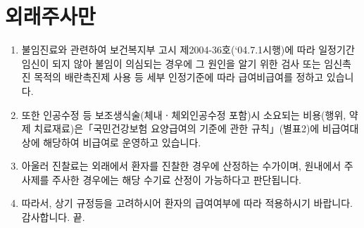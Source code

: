 \section{외래주사만}
%
{\begin{enumerate}\tightlist
\item 불임진료와 관련하여 보건복지부 고시 제2004-36호(‘04.7.1시행)에 따라 일정기간 임신이 되지 않아 불임이 의심되는 경우에 그 원인을 알기 위한 검사 또는 임신촉진 목적의 배란촉진제 사용 등 세부 인정기준에 따라 급여\bullet 비급여를 정하고 있습니다.
\item 또한 인공수정 등 보조생식술(체내ㆍ체외인공수정 포함)시 소요되는 비용(행위, 약제 치료재료)은「국민건강보험 요양급여의 기준에 관한 규칙」(별표2)에 비급여대상에 해당하여 비급여로 운영하고 있습니다.
\item 아울러 진찰료는 외래에서 환자를 진찰한 경우에 산정하는 수가이며, 원내에서 주사제를 주사한 경우에는 해당 수기료 산정이 가능하다고 판단됩니다.
\item 따라서, 상기 규정등을 고려하시어 환자의 급여여부에 따라 적용하시기 바랍니다. 감사합니다. 끝.
\end{enumerate}
}
